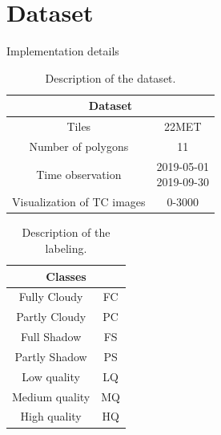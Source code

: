 \documentclass{beamer}
\begin{document}
\section{Dataset}
\begin{frame}{Implementation details}
    \begin{minipage}{0.6\textwidth}
        \begin{table}
            \scriptsize
            \begin{tabular}{c|c}
                \hline
                \multicolumn{2}{c}{\textbf{Dataset}} \\
                \hline  	
                Tiles &  22MET \\
                Number of polygons & 11 \\
                Time observation & \makecell{2019-05-01 \\ 2019-09-30} \\
                Visualization of TC images & 0-3000 \\
                \hline
            \end{tabular}
            \caption{Description of the dataset.}
        \end{table}
    \end{minipage}
    \begin{minipage}{0.35\textwidth}
        \begin{table}
            \scriptsize
            \begin{tabular}{c|c}
            \hline
                \multicolumn{2}{c}{\textbf{Classes}} \\ \hline
                Fully Cloudy & FC \\
                Partly Cloudy& PC \\
                Full Shadow & FS \\
                Partly Shadow& PS \\
                Low quality & LQ \\
                Medium quality & MQ\\
                High quality & HQ \\
                \hline
            \end{tabular}
            \caption{Description of the labeling.}
        \end{table}
    \end{minipage}
\end{frame}
\end{document}
